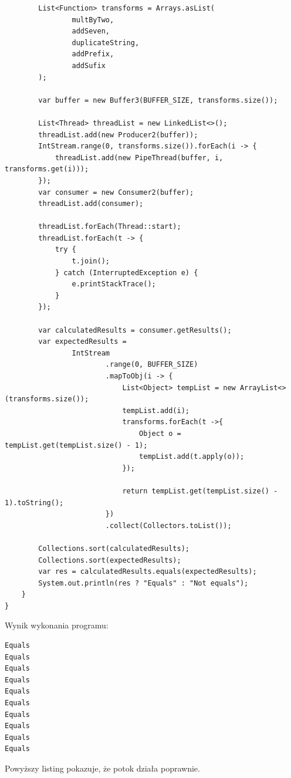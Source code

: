 \documentclass[12pt]{article}
\begin{document}
\begin{verbatim}
        List<Function> transforms = Arrays.asList(
                multByTwo,
                addSeven,
                duplicateString,
                addPrefix,
                addSufix
        );

        var buffer = new Buffer3(BUFFER_SIZE, transforms.size());

        List<Thread> threadList = new LinkedList<>();
        threadList.add(new Producer2(buffer));
        IntStream.range(0, transforms.size()).forEach(i -> {
            threadList.add(new PipeThread(buffer, i, transforms.get(i)));
        });
        var consumer = new Consumer2(buffer);
        threadList.add(consumer);

        threadList.forEach(Thread::start);
        threadList.forEach(t -> {
            try {
                t.join();
            } catch (InterruptedException e) {
                e.printStackTrace();
            }
        });

        var calculatedResults = consumer.getResults();
        var expectedResults =
                IntStream
                        .range(0, BUFFER_SIZE)
                        .mapToObj(i -> {
                            List<Object> tempList = new ArrayList<>(transforms.size());
                            tempList.add(i);
                            transforms.forEach(t ->{
                                Object o = tempList.get(tempList.size() - 1);
                                tempList.add(t.apply(o));
                            });

                            return tempList.get(tempList.size() - 1).toString();
                        })
                        .collect(Collectors.toList());

        Collections.sort(calculatedResults);
        Collections.sort(expectedResults);
        var res = calculatedResults.equals(expectedResults);
        System.out.println(res ? "Equals" : "Not equals");
    }
}
\end{verbatim}
\vspace{0.5cm}
Wynik wykonania programu:
\begin{verbatim}
Equals
Equals
Equals
Equals
Equals
Equals
Equals
Equals
Equals
Equals
\end{verbatim}

Powyższy listing pokazuje, że potok działa poprawnie.
\end{document}
